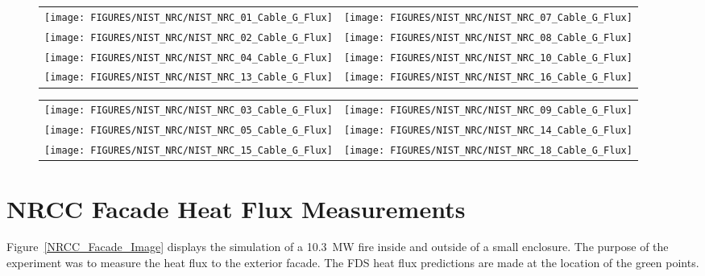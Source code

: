 \begin{figure}[p]
\begin{tabular*}{\textwidth}{l@{\extracolsep{\fill}}r}
\texttt{[image: FIGURES/NIST\_NRC/NIST\_NRC\_01\_Cable\_G\_Flux]} &
\texttt{[image: FIGURES/NIST\_NRC/NIST\_NRC\_07\_Cable\_G\_Flux]} \\
\texttt{[image: FIGURES/NIST\_NRC/NIST\_NRC\_02\_Cable\_G\_Flux]} &
\texttt{[image: FIGURES/NIST\_NRC/NIST\_NRC\_08\_Cable\_G\_Flux]} \\
\texttt{[image: FIGURES/NIST\_NRC/NIST\_NRC\_04\_Cable\_G\_Flux]} &
\texttt{[image: FIGURES/NIST\_NRC/NIST\_NRC\_10\_Cable\_G\_Flux]} \\
\texttt{[image: FIGURES/NIST\_NRC/NIST\_NRC\_13\_Cable\_G\_Flux]} &
\texttt{[image: FIGURES/NIST\_NRC/NIST\_NRC\_16\_Cable\_G\_Flux]}
\end{tabular*}
\label{NIST_NRC_Cable_G_Flux_Closed}
\end{figure}

\begin{figure}[p]
\begin{tabular*}{\textwidth}{l@{\extracolsep{\fill}}r}
\texttt{[image: FIGURES/NIST\_NRC/NIST\_NRC\_03\_Cable\_G\_Flux]} &
\texttt{[image: FIGURES/NIST\_NRC/NIST\_NRC\_09\_Cable\_G\_Flux]} \\
\texttt{[image: FIGURES/NIST\_NRC/NIST\_NRC\_05\_Cable\_G\_Flux]} &
\texttt{[image: FIGURES/NIST\_NRC/NIST\_NRC\_14\_Cable\_G\_Flux]} \\
\texttt{[image: FIGURES/NIST\_NRC/NIST\_NRC\_15\_Cable\_G\_Flux]} &
\texttt{[image: FIGURES/NIST\_NRC/NIST\_NRC\_18\_Cable\_G\_Flux]}
\end{tabular*}
\label{NIST_NRC_Cable_G_Flux_Open}
\end{figure}

\clearpage


\section{NRCC Facade Heat Flux Measurements}

Figure~\ref{NRCC_Facade_Image} displays the simulation of a 10.3~MW fire inside and outside of a small enclosure. The purpose of the experiment was to measure the heat flux to the exterior facade. The FDS heat flux predictions are made at the location of the green points.


